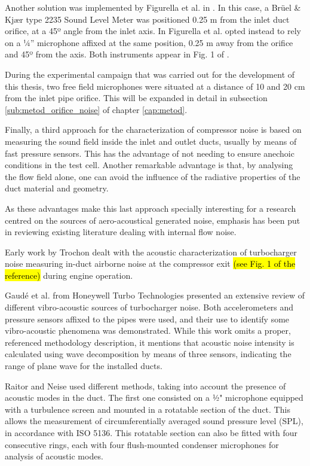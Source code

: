 Another solution was implemented by Figurella et al. in \cite{figurella2012noise}. In this case, a Brüel \& Kj\ae r type 2235 Sound Level Meter was positioned 0.25 m from the inlet duct orifice, at a 45º angle from the inlet axis. In \cite{figurella2014effect} Figurella et al. opted instead to rely on a ¼'' microphone affixed at the same position, 0.25 m away from the orifice and 45º from the axis. Both instruments appear in Fig. 1 of \cite{figurella2014effect}.

During the experimental campaign that was carried out for the development of this thesis, two free field microphones were situated at a distance of 10 and 20 cm from the inlet pipe orifice. This will be expanded in detail in subsection \ref{sub:metod_orifice_noise} of chapter \ref{cap:metod}.

Finally, a third approach for the characterization of compressor noise is based on measuring the sound field inside the inlet and outlet ducts, usually by means of fast pressure sensors. This has the advantage of not needing to ensure anechoic conditions in the test cell. Another remarkable advantage is that, by analysing the flow field alone, one can avoid the influence of the radiative properties of the duct material and geometry.

As these advantages make this last approach specially interesting for a research centred on the sources of aero-acoustical generated noise, emphasis has been put in reviewing existing literature dealing with internal flow noise.

Early work by Trochon \cite{trochon2001new} dealt with the acoustic characterization of turbocharger noise measuring in-duct airborne noise at the compressor exit \hl{(see Fig. 1 of the reference)} during engine operation.

Gaudé et al. \cite{gaude2008experimental} from Honeywell Turbo Technologies presented an extensive review of different vibro-acoustic sources of turbocharger noise. Both accelerometers and pressure sensors affixed to the pipes were used, and their use to identify some vibro-acoustic phenomena was demonstrated. While this work omits a proper, referenced methodology description, it mentions that acoustic noise intensity is calculated using wave decomposition by means of three sensors, indicating the range of plane wave for the installed ducts.

Raitor and Neise \cite{raitor2008sound} used different methods, taking into account the presence of acoustic modes in the duct. The first one consisted on a ½" microphone equipped with a turbulence screen and mounted in a rotatable section of the duct. This allows the measurement of circumferentially averaged sound pressure level (SPL), in accordance with ISO 5136. This rotatable section can also be fitted with four consecutive rings, each with four flush-mounted condenser microphones for analysis of acoustic modes.

